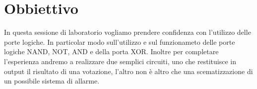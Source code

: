 \section*{Obbiettivo}

In questa sessione di laboratorio vogliamo prendere confidenza con l'utilizzo delle porte logiche. In particolar modo sull'utilizzo e sul funzionameto delle porte logiche NAND, NOT, AND e della porta XOR. Inoltre per completare l'esperienza andremo a realizzare due semplici circuiti, uno che restituisce in output il risultato di una votazione, l'altro non è altro che una scematizzazione di un possibile sistema di allarme.